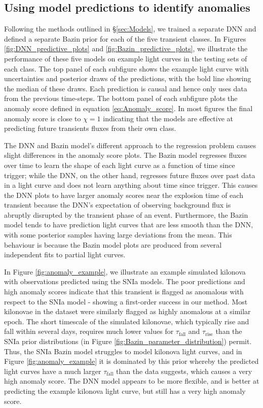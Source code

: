 \documentclass[fleqn,usenatbib]{mnras}
\begin{document}
\subsection{Using model predictions to identify anomalies}
Following the methods outlined in \S\ref{sec:Models}, we trained a separate DNN and defined a separate Bazin prior for each of the five transient classes. In Figures \ref{fig:DNN_predictive_plots} and \ref{fig:Bazin_predictive_plots}, we illustrate the performance of these five models on example light curves in the testing sets of each class. The top panel of each subfigure shows the example light curve with uncertainties and posterior draws of the predictions, with the bold line showing the median of these draws. Each prediction is causal and hence only uses data from the previous time-steps. The bottom panel of each subfigure plots the anomaly score defined in equation \ref{eq:Anomaly_score}. In most figures the final anomaly score is close to $\chi=1$ indicating that the models are effective at predicting future transients fluxes from their own class. 

The DNN and Bazin model's different approach to the regression problem causes slight differences in the anomaly score plots. The Bazin model regresses fluxes over time to learn the shape of each light curve as a function of time since trigger; while the DNN, on the other hand, regresses future fluxes over past data in a light curve and does not learn anything about time since trigger. This causes the DNN plots to have larger anomaly scores near the explosion time of each transient because the DNN's expectation of observing background flux is abruptly disrupted by the transient phase of an event. Furthermore, the Bazin model tends to have prediction light curves that are less smooth than the DNN, with some posterior samples having large deviations from the mean. This behaviour is because the Bazin model plots are produced from several independent fits to partial light curves. 

In Figure \ref{fig:anomaly_example}, we illustrate an example simulated kilonova with observations predicted using the SNIa models. The poor predictions and high anomaly scores indicate that this transient is flagged as anomalous with respect to the SNIa model - showing a first-order success in our method. Most kilonovae in the dataset were similarly flagged as highly anomalous at a similar epoch. The short timescale of the simulated kilonovae, which typically rise and fall within several days, requires much lower values for  $\tau_{\mathrm{fall}}$ and $\tau_{\mathrm{rise}}$ than the SNIa prior distributions (in Figure \ref{fig:Bazin_parameter_distribution}) permit.  Thus, the SNIa Bazin model struggles to model kilonova light curves, and in Figure \ref{fig:anomaly_example} it is dominated by this prior whereby the predicted light curves have a much larger $\tau_{\mathrm{fall}}$ than the data suggests, which causes a very high anomaly score. The DNN model appears to be more flexible, and is better at predicting the example kilonova light curve, but still has a very high anomaly score.
\end{document}
